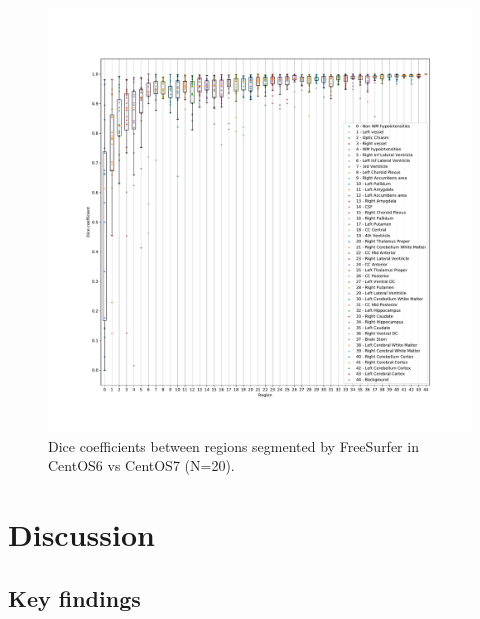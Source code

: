 \documentclass[a4paper,num-refs]{oup-contemporary}
\begin{document}
\begin{figure}
  \hspace*{-1cm}
  \includegraphics[width=1.2\linewidth]{images/dice_regions.pdf}
    \caption{Dice coefficients between regions segmented by FreeSurfer in CentOS6 vs CentOS7 (N=20).}
    \label{fig:scatter_plot}
  \end{figure}

  

\section{Discussion}

\subsection{Key findings}
\end{document}

